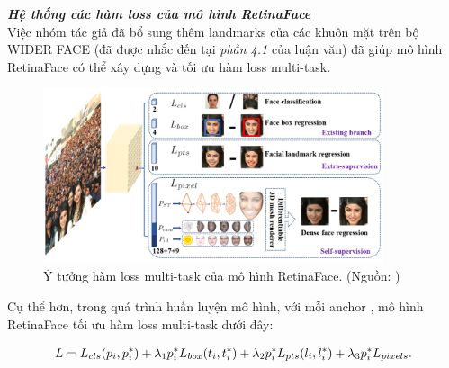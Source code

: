 {    \noindent
    \textbf{\textit{Hệ thống các hàm loss của mô hình RetinaFace}} \\
    Việc nhóm tác giả đã bổ sung thêm landmarks của các khuôn mặt trên bộ WIDER FACE (đã được nhắc đến tại \textit{phần 4.1} của luận văn) đã giúp mô hình RetinaFace có thể xây dựng và tối ưu hàm loss multi-task.

    \begin{figure}[H]
        \centering
        \includegraphics[width=10cm] {images/retinaface_loss_funcs}
        \caption{Ý tưởng hàm loss multi-task của mô hình RetinaFace. (Nguồn: \cite{deng2020retinaface})}
        \label{fig:retinaface_loss_funcs}
    \end{figure}

    Cụ thể hơn, trong quá trình huấn luyện mô hình, với mỗi anchor , mô hình RetinaFace tối ưu hàm loss multi-task dưới đây:

    \begin{equation}
        \begin{split}
        L  & =  L_{cls}(p_i, p^{*}_i) + \lambda_1 p^{*}_i L_{box}(t_i, t^{*}_i) + \lambda_2 p^{*}_i L_{pts} (l_i, l^{*}_i) + \lambda_3 p^{*}_i L_{pixels \index{pixels}}.\\
        \end{split}
        \label{eq:retinaface_loss}
    \end{equation}

}
